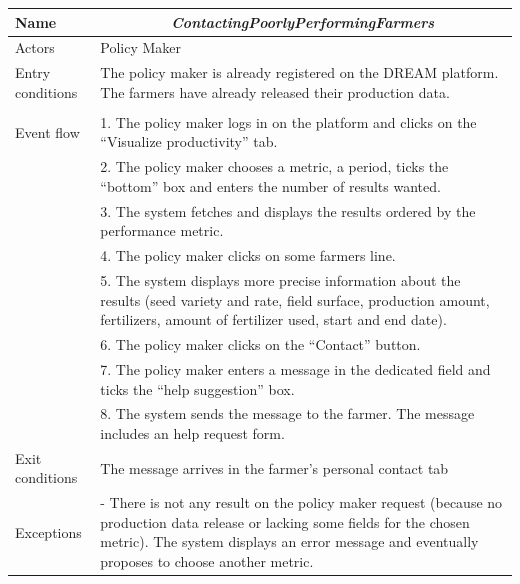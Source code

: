 \begin{table}[H]
	\centering
	\begin{tabularx}{\linewidth}{|l|X|}
		\hline
		Name & \multicolumn{1}{c|}{\textit{\textbf{ContactingPoorlyPerformingFarmers}}}                                                   \tabularnewline \hline
		Actors                                               & Policy Maker                                                    \tabularnewline \hline
		Entry conditions                                              &
		The policy maker is already registered on the DREAM platform.
		The farmers have already released their production data.
		\tabularnewline
		&
		\tabularnewline \hline
		Event flow                                         & 1.	The policy maker logs in on the platform and clicks on the “Visualize productivity” tab.                                         \tabularnewline 
		& 2.	The policy maker chooses a metric, a period, ticks the “bottom” box and enters the number of results wanted.                                           \tabularnewline 
		& 3.	The system fetches and displays the results ordered by the performance metric.                                           \tabularnewline 
		& 4.	The policy maker clicks on some farmers line.                                    \tabularnewline
		& 5.	The system displays more precise information about the results (seed variety and rate, field surface, production amount, fertilizers, amount of fertilizer used, start and end date).                                           \tabularnewline
		& 6.	The policy maker clicks on the “Contact” button.                                     \tabularnewline
		& 7.	The policy maker enters a message in the dedicated field and ticks the “help suggestion” box.                                \tabularnewline
		& 8.	The system sends the message to the farmer. The message includes an help request form.                               \tabularnewline \hline
		Exit conditions 
		& The message arrives in the farmer’s personal contact tab
		\tabularnewline \hline
		Exceptions 
		& -	There is not any result on the policy maker request (because no production data release or lacking some fields for the chosen metric). The system displays an error message and eventually proposes to choose another metric.
		\tabularnewline
		\hline
	\end{tabularx}   
\end{table}

